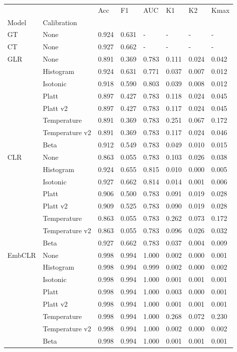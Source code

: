 \begin{tabular}{llllllll}
\toprule
 &  & Acc & F1 & AUC & K1 & K2 & Kmax \\
Model & Calibration &  &  &  &  &  &  \\
\midrule
GT & None & 0.924 & 0.631 & - & - & - & - \\
\cline{1-8}
CT & None & 0.927 & 0.662 & - & - & - & - \\
\cline{1-8}
\multirow[t]{8}{*}{GLR} & None & 0.891 & 0.369 & 0.783 & 0.111 & 0.024 & 0.042 \\
 & Histogram & 0.924 & 0.631 & 0.771 & 0.037 & 0.007 & 0.012 \\
 & Isotonic & 0.918 & 0.590 & 0.803 & 0.039 & 0.008 & 0.012 \\
 & Platt & 0.897 & 0.427 & 0.783 & 0.118 & 0.024 & 0.045 \\
 & Platt v2 & 0.897 & 0.427 & 0.783 & 0.117 & 0.024 & 0.045 \\
 & Temperature & 0.891 & 0.369 & 0.783 & 0.251 & 0.067 & 0.172 \\
 & Temperature v2 & 0.891 & 0.369 & 0.783 & 0.117 & 0.024 & 0.046 \\
 & Beta & 0.912 & 0.549 & 0.783 & 0.049 & 0.010 & 0.015 \\
\cline{1-8}
\multirow[t]{8}{*}{CLR} & None & 0.863 & 0.055 & 0.783 & 0.103 & 0.026 & 0.038 \\
 & Histogram & 0.924 & 0.655 & 0.815 & 0.010 & 0.000 & 0.005 \\
 & Isotonic & 0.927 & 0.662 & 0.814 & 0.014 & 0.001 & 0.006 \\
 & Platt & 0.906 & 0.500 & 0.783 & 0.091 & 0.019 & 0.028 \\
 & Platt v2 & 0.909 & 0.525 & 0.783 & 0.090 & 0.019 & 0.028 \\
 & Temperature & 0.863 & 0.055 & 0.783 & 0.262 & 0.073 & 0.172 \\
 & Temperature v2 & 0.863 & 0.055 & 0.783 & 0.096 & 0.026 & 0.032 \\
 & Beta & 0.927 & 0.662 & 0.783 & 0.037 & 0.004 & 0.009 \\
\cline{1-8}
\multirow[t]{8}{*}{EmbCLR} & None & 0.998 & 0.994 & 1.000 & 0.002 & 0.000 & 0.001 \\
 & Histogram & 0.998 & 0.994 & 0.999 & 0.002 & 0.000 & 0.002 \\
 & Isotonic & 0.998 & 0.994 & 1.000 & 0.001 & 0.001 & 0.001 \\
 & Platt & 0.998 & 0.994 & 1.000 & 0.003 & 0.000 & 0.001 \\
 & Platt v2 & 0.998 & 0.994 & 1.000 & 0.001 & 0.001 & 0.001 \\
 & Temperature & 0.998 & 0.994 & 1.000 & 0.268 & 0.072 & 0.230 \\
 & Temperature v2 & 0.998 & 0.994 & 1.000 & 0.002 & 0.000 & 0.002 \\
 & Beta & 0.998 & 0.994 & 1.000 & 0.001 & 0.001 & 0.001 \\
\cline{1-8}
\bottomrule
\end{tabular}
